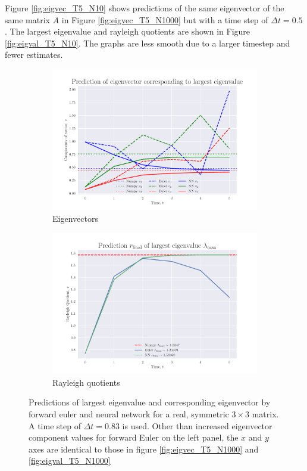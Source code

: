 \documentclass[12pt]{extarticle}
\begin{document}
Figure \ref{fig:eigvec_T5_N10} shows predictions of the same eigenvector of the same matrix $A$ in Figure \ref{fig:eigvec_T5_N1000} but with a time step of $\Delta t = 0.5$. The largest eigenvalue and rayleigh quotients are shown in Figure \ref{fig:eigval_T5_N10}.
The graphs are less smooth due to a larger timestep and fewer estimates. 

\begin{figure}[h]
	\centering
	\begin{subfigure}{0.49\textwidth}
		\centering
		\includegraphics[width=\textwidth]{../output/plots/eigvec_T5_N6.pdf}
		\caption{Eigenvectors}
		\label{fig:eigvec_T5_N6}
	\end{subfigure}
	\hfill
	\begin{subfigure}{0.49\textwidth}
		\centering
		\includegraphics[width=\textwidth]{../output/plots/eigval_T5_N6.pdf}
		\caption{Rayleigh quotients}
		\label{fig:eigval_T5_N6}
	\end{subfigure}
	\caption{Predictions of largest eigenvalue and corresponding eigenvector by forward euler and neural network for a real, symmetric $3\times 3$ matrix. A time step of $\Delta t = 0.83$ is used. Other than increased eigenvector component values for forward Euler on the left panel, the $x$ and $y$ axes are identical to those in figure \ref{fig:eigvec_T5_N1000} and \ref{fig:eigval_T5_N1000}}
	\label{fig:eig_T5_N6}
\end{figure}
\end{document}
